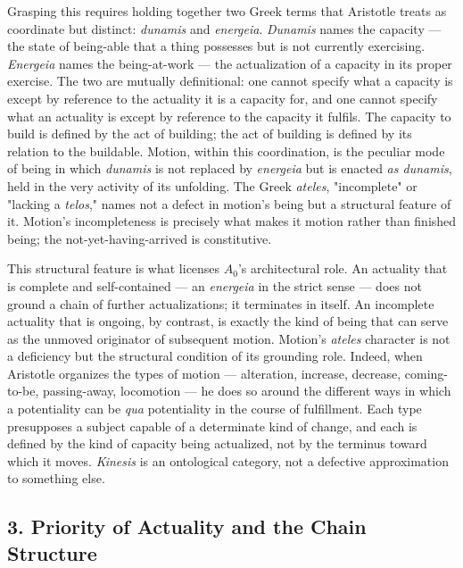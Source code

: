 \documentclass[12pt]{article}
\begin{document}
Grasping this requires holding together two Greek terms that Aristotle treats as coordinate but distinct: \textit{dunamis} and \textit{energeia}. \textit{Dunamis} names the capacity --- the state of being-able that a thing possesses but is not currently exercising. \textit{Energeia} names the being-at-work --- the actualization of a capacity in its proper exercise. The two are mutually definitional: one cannot specify what a capacity is except by reference to the actuality it is a capacity for, and one cannot specify what an actuality is except by reference to the capacity it fulfils. The capacity to build is defined by the act of building; the act of building is defined by its relation to the buildable. Motion, within this coordination, is the peculiar mode of being in which \textit{dunamis} is not replaced by \textit{energeia} but is enacted \textit{as dunamis}, held in the very activity of its unfolding. The Greek \textit{ateles}, "incomplete" or "lacking a \textit{telos}," names not a defect in motion's being but a structural feature of it. Motion's incompleteness is precisely what makes it motion rather than finished being; the not-yet-having-arrived is constitutive.

This structural feature is what licenses $A_0$'s architectural role. An actuality that is complete and self-contained --- an \textit{energeia} in the strict sense --- does not ground a chain of further actualizations; it terminates in itself. An incomplete actuality that is ongoing, by contrast, is exactly the kind of being that can serve as the unmoved originator of subsequent motion. Motion's \textit{ateles} character is not a deficiency but the structural condition of its grounding role. Indeed, when Aristotle organizes the types of motion --- alteration, increase, decrease, coming-to-be, passing-away, locomotion --- he does so around the different ways in which a potentiality can be \textit{qua} potentiality in the course of fulfillment. Each type presupposes a subject capable of a determinate kind of change, and each is defined by the kind of capacity being actualized, not by the terminus toward which it moves. \textit{Kinesis} is an ontological category, not a defective approximation to something else.

\subsection*{3. Priority of Actuality and the Chain Structure}
\end{document}
